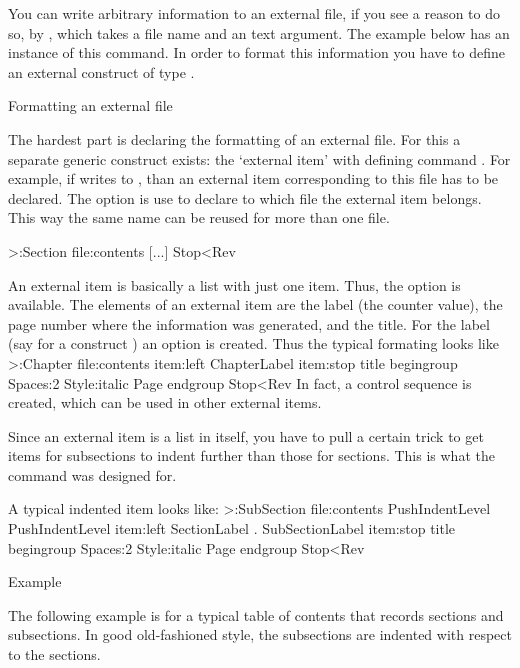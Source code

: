 You can write arbitrary information to an external file, if you see a
reason to do so, by , which takes a file name
and an text argument. The example below has an instance of this
command. In order to format this information you have to define an
external construct of type .

 Formatting an external file

The hardest part is declaring the formatting of an external file. For
this a separate generic construct exists: the `external item' with
defining command . For example, if
 writes to , than an external item 
corresponding to this file has to be declared. The option
 is use to declare to which file the external item
belongs. This way the same name can be reused for more than one file.

\Ver>\DefineExternalItem:Section file:contents
    [...] Stop<Rev

An external item is basically a list with just one item. Thus, the
option  is available. The elements of an external item are
the label (the counter value), the page number where the information
was generated, and the title. 
For the label (say for a construct )
an option  is created.
Thus the typical formating looks like
\Ver>\DefineExternalItem:Chapter file:contents
    item:left ChapterLabel item:stop
    title begingroup Spaces:2 Style:italic Page endgroup
    Stop<Rev
In fact, a control sequence  is created, which
can be used in other external items.

Since an external item is a list in itself, you have to pull a
certain trick to get items for subsections to indent further than
those for sections. This is what the command  was
designed for.

A typical indented item looks like:
\Ver>\DefineExternalItem:SubSection file:contents
    PushIndentLevel PushIndentLevel
    item:left SectionLabel . SubSectionLabel item:stop
    title begingroup Spaces:2 Style:italic Page endgroup
    Stop<Rev

\Section Example

The following example is for a typical table of contents that
records sections and subsections. In good old-fashioned style, the
subsections are indented with respect to the sections.
\endinput
\Example
\DefineExternalFile:TheContents=tct
\DefineHeading:TestChapter Style:bold
 line:start TestChapterCounter Spaces:2 title line:stop
 external:TheContents title external:stop Stop
\DefineExternalItem:TestChapter file:TheContents
 item:left Style:bold TestChapterLabel item:stop title white:5pt
      Page par Stop
\DefineHeading:TestSection Style:italic
 line:start TestChapterCounter . TestSectionCounter 
            Spaces:2 title line:stop
 external:TheContents title external:stop Stop
\GoverningCounter:TestSection=TestChapter
\DefineExternalItem:TestSection file:TheContents PushIndentLevel
 item:left Style:bold TestChapterLabel . TestSectionLabel item:stop 
 title white:5pt Page par Stop
\DefineExternalItem:anon file:TheContents begingroup
 Style:italic title white:5pt Page par Stop

